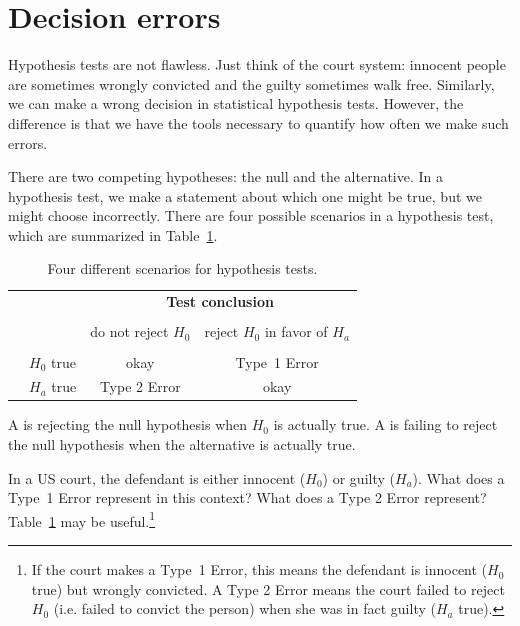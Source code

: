 \pagebreak


\section{Decision errors}


Hypothesis tests are not flawless. Just think of the court system: innocent people are sometimes wrongly convicted and the guilty sometimes walk free. Similarly, we can make a wrong decision in statistical hypothesis tests. However, the difference is that we have the tools necessary to quantify how often we make such errors.

There are two competing hypotheses: the null and the alternative. In a hypothesis test, we make a statement about which one might be true, but we might choose incorrectly. There are four possible scenarios in a hypothesis test, which are summarized in Table~\ref{fourHTScenarios}.

\begin{table}[ht]
\centering
\begin{tabular}{l l c c}
& & \multicolumn{2}{c}{\textbf{Test conclusion}} \\
  \cline{3-4}
\vspace{-3.7mm} \\
& & do not reject $H_0$ &  reject $H_0$ in favor of $H_a$ \\
  \cline{2-4}
\vspace{-3.7mm} \\
& $H_0$ true & okay &  Type~1 Error \\
\raisebox{1.5ex}{\textbf{Truth}} & $H_a$ true & Type 2 Error & okay \\
  \cline{2-4}
\end{tabular}
\caption{Four different scenarios for hypothesis tests.}
\label{fourHTScenarios}
\end{table}

A  is rejecting the null hypothesis when $H_0$ is actually true. A  is failing to reject the null hypothesis when the alternative is actually true.

\begin{exercise} \label{whatAreTheErrorTypesInUSCourts}
In a US court, the defendant is either innocent ($H_0$) or  guilty ($H_a$). What does a Type~1 Error represent in this context? What does a Type 2 Error represent? Table~\ref{fourHTScenarios} may be useful.\footnote{If the court makes a Type~1 Error, this means the defendant is innocent ($H_0$ true) but wrongly convicted. A Type 2 Error means the court failed to reject $H_0$ (i.e. failed to convict the person) when she was in fact guilty ($H_a$ true).}
\end{exercise}

